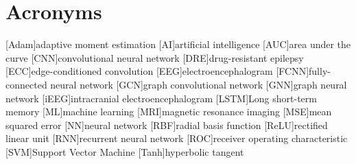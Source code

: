 
\chapter{Acronyms} \label{chap: Acronyms}

\begin{acronym}[AAAAA]
    [Adam]{adaptive moment estimation}
    [AI]{artificial intelligence}
    [AUC]{area under the curve}
    [CNN]{convolutional neural network}
    [DRE]{drug-resistant epilepsy}
    [ECC]{edge-conditioned convolution}
    [EEG]{electroencephalogram}
    [FCNN]{fully-connected neural network}
    [GCN]{graph convolutional network}
    [GNN]{graph neural network}
    [iEEG]{intracranial electroencephalogram}
    [LSTM]{Long short-term memory}
    [ML]{machine learning}
    [MRI]{magnetic resonance imaging}
    [MSE]{mean squared error}
    [NN]{neural network}
    [RBF]{radial basis function}
    [ReLU]{rectified linear unit}
    [RNN]{recurrent neural network}
    [ROC]{receiver operating characteristic}
    [SVM]{Support Vector Machine}
    [Tanh]{hyperbolic tangent}
\end{acronym}

